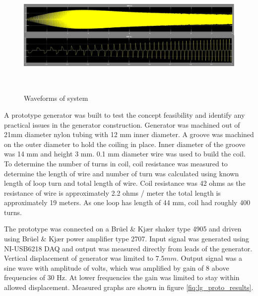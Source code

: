 \begin{figure}[htb]
  \begin{center}
  \includegraphics[height=6cm]{images/own_dwg/simulink_waveforms.jpg}
  \end{center}
  \caption{\label{fiq:simulink_waveforms} Waveforms of system}
\end{figure}

A prototype generator was built to test the concept feasibility and identify any practical issues in the generator construction. Generator was machined out of 21mm diameter nylon tubing with 12 mm inner diameter. A groove was machined on the outer diameter to hold the coiling in place. Inner diameter of the groove was 14 mm and height 3 mm. 0.1 mm diameter wire was used to build the coil. To determine the number of turns in coil, coil resistance was measured to determine the length of wire and number of turn was calculated using known length of loop turn and total length of wire. Coil resistance was 42 ohms as the resistance of wire is approximately 2.2 ohms / meter the total length is approximately 19 meters. As one loop has length of 44 mm, coil had roughly 400 turns. 

The prototype was connected on a  Brüel & Kjær shaker type 4905 and driven using  Brüel & Kjær power amplifier type 2707. Input signal was generated using NI-USB6218 DAQ and output was measured directly from leads of the generator. Vertical displacement of generator was limited to $7.5 mm$. Output signal was a sine wave with amplitude of  volts, which was amplified by gain of 8 above frequencies of 30 Hz. At lower frequencies the gain was limited to stay within allowed displacement. Measured graphs are shown in figure \ref{fiq:lg_proto_results}.

